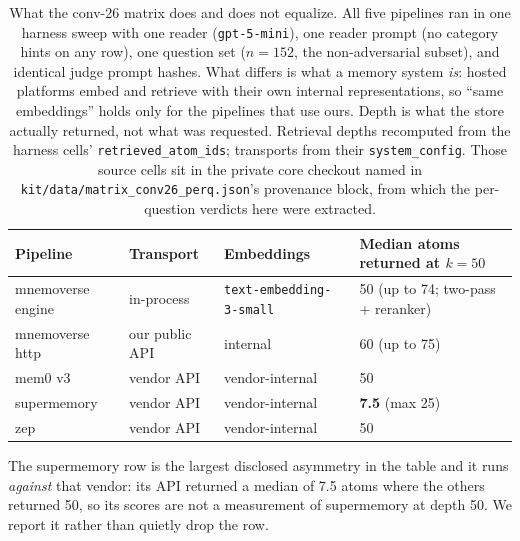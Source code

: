 \documentclass[11pt]{article}
\begin{document}
\begin{table}[t]
\centering
\caption{What the conv-26 matrix does and does not equalize. All five pipelines ran in one harness sweep with one reader (\texttt{gpt-5-mini}), one reader prompt (no category hints on any row), one question set ($n=152$, the non-adversarial subset), and identical judge prompt hashes. What differs is what a memory system \emph{is}: hosted platforms embed and retrieve with their own internal representations, so ``same embeddings'' holds only for the pipelines that use ours. Depth is what the store actually returned, not what was requested. Retrieval depths recomputed from the harness cells' \texttt{retrieved\_atom\_ids}; transports from their \texttt{system\_config}. Those source cells sit in the private core checkout named in \texttt{kit/data/matrix\_conv26\_perq.json}'s provenance block, from which the per-question verdicts here were extracted.}
\label{tab:protocol}
\small
\begin{tabular}{@{}llll@{}}
\toprule
Pipeline & Transport & Embeddings & Median atoms returned at $k{=}50$ \\
\midrule
mnemoverse engine & in-process & \texttt{text-embedding-3-small} & 50 (up to 74; two-pass + reranker) \\
mnemoverse http   & our public API & internal & 60 (up to 75) \\
mem0 v3           & vendor API & vendor-internal & 50 \\
supermemory       & vendor API & vendor-internal & \textbf{7.5} (max 25) \\
zep               & vendor API & vendor-internal & 50 \\
\bottomrule
\end{tabular}

\vspace{2pt}
{\footnotesize The supermemory row is the largest disclosed asymmetry in the table and it runs \emph{against} that vendor: its API returned a median of 7.5 atoms where the others returned 50, so its scores are not a measurement of supermemory at depth 50. We report it rather than quietly drop the row.}
\end{table}
\end{document}
